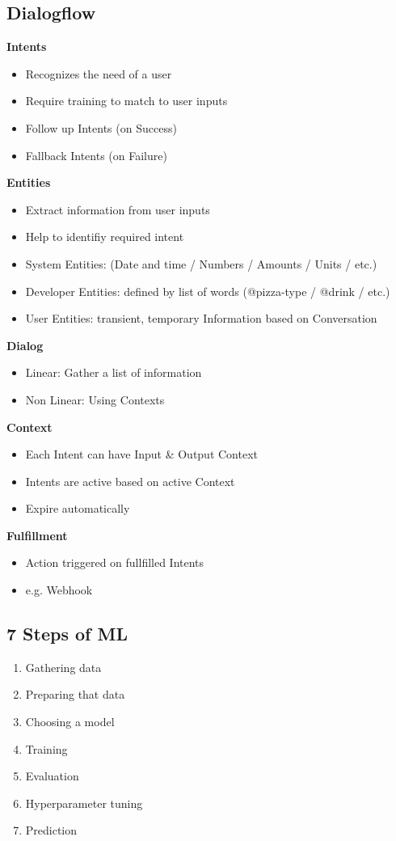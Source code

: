 \subsection{Dialogflow}
\textbf{Intents}
\begin{itemize}
    \item Recognizes the need of a user
    \item Require training to match to user inputs
    \item Follow up Intents (on Success)
    \item Fallback Intents (on Failure)
\end{itemize}
\textbf{Entities}
\begin{itemize}
    \item Extract information from user inputs
    \item Help to identifiy required intent
    \item System Entities: (Date and time / Numbers / Amounts / Units / etc.)
    \item Developer Entities: defined by list of words (@pizza-type / @drink / etc.)
    \item User Entities: transient, temporary Information based on Conversation
\end{itemize}
\textbf{Dialog}
\begin{itemize}
    \item Linear: Gather a list of information
    \item Non Linear: Using Contexts
\end{itemize}
\textbf{Context}
\begin{itemize}
    \item Each Intent can have Input \& Output Context
    \item Intents are active based on active Context
    \item Expire automatically
\end{itemize}
\textbf{Fulfillment}
\begin{itemize}
    \item Action triggered on fullfilled Intents
    \item e.g. Webhook
\end{itemize}

\subsection{7 Steps of ML}
\begin{enumerate}
    \item Gathering data
    \item Preparing that data
    \item Choosing a model
    \item Training
    \item Evaluation
    \item Hyperparameter tuning
    \item Prediction
\end{enumerate}